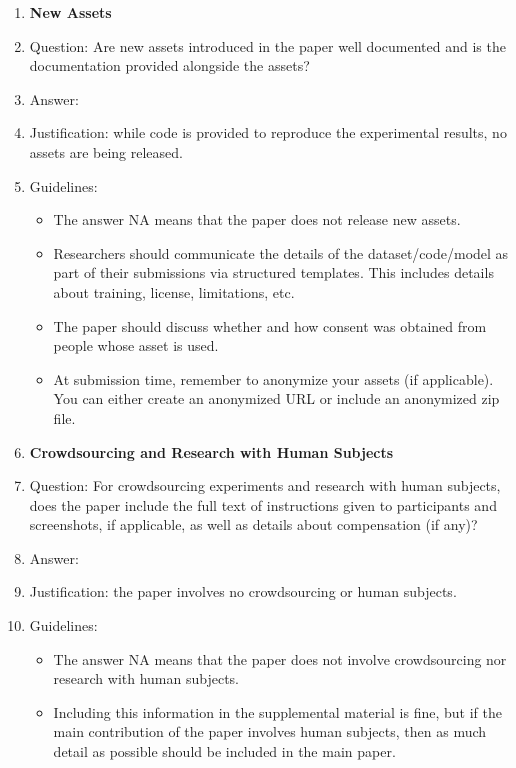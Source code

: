 \documentclass{article}
\begin{document}
\begin{enumerate}
\begin{itemize}
        \item If this information is not available online, the authors are encouraged to reach out to the asset's creators.
    \end{itemize}
\item {\bf New Assets}
    \item[] Question: Are new assets introduced in the paper well documented and is the documentation provided alongside the assets?
    \item[] Answer: \answerNA{}
    \item[] Justification: while code is provided to reproduce the experimental results, no assets are being released.
    \item[] Guidelines:
    \begin{itemize}
        \item The answer NA means that the paper does not release new assets.
        \item Researchers should communicate the details of the dataset/code/model as part of their submissions via structured templates. This includes details about training, license, limitations, etc.
        \item The paper should discuss whether and how consent was obtained from people whose asset is used.
        \item At submission time, remember to anonymize your assets (if applicable). You can either create an anonymized URL or include an anonymized zip file.
    \end{itemize}
\item {\bf Crowdsourcing and Research with Human Subjects}
    \item[] Question: For crowdsourcing experiments and research with human subjects, does the paper include the full text of instructions given to participants and screenshots, if applicable, as well as details about compensation (if any)?
    \item[] Answer: \answerNA{}
    \item[] Justification: the paper involves no crowdsourcing or human subjects.
    \item[] Guidelines:
    \begin{itemize}
        \item The answer NA means that the paper does not involve crowdsourcing nor research with human subjects.
        \item Including this information in the supplemental material is fine, but if the main contribution of the paper involves human subjects, then as much detail as possible should be included in the main paper.

\end{itemize}
\end{enumerate}
\end{document}
